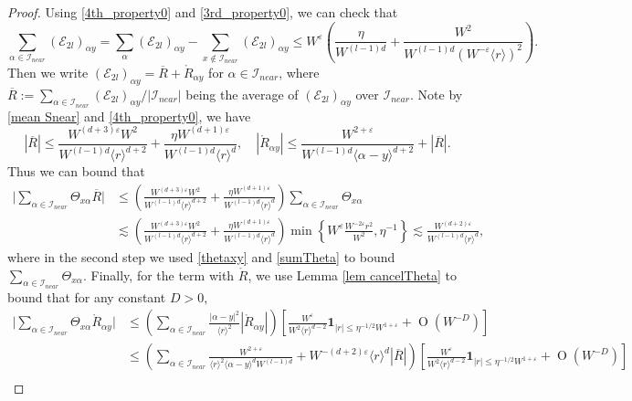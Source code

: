 \documentclass{article}
\newcommand{\1}{\mathds{1}}
\numberwithin{equation}{section}
\newcommand{\al}{\alpha}
\newcommand{\be}{\begin{equation}}
\newcommand{\ee}{\end{equation}}
\newcommand{\e}{{\varepsilon}}
\renewcommand{\cal}{\mathcal}
\newcommand{\wt}{\widetilde}
\renewcommand{\leq}{\leqslant}
\renewcommand{\le}{\leq}
\DeclareMathOperator{\OO}{O}
\theoremstyle{plain} %
\theoremstyle{remark}
\newcommand{\Selek}{{\mathcal E}}
\begin{document}
\begin{proof}
	Using \eqref{4th_property0} and \eqref{3rd_property0}, we can check that 
	\be\label{mean Snear}\sum_{\al\in \cal I_{near}} (\Selek_{2l})_{\al y}=\sum_\al (\Selek_{2l})_{\al y} - \sum_{x\notin \cal I_{near}} (\Selek_{2l})_{\al y} \le W^\e\left(\frac{\eta}{ W^{(l-1)d} } + \frac{W^2}{W^{(l-1)d} (W^{-\e}\langle r\rangle)^{2}}\right).\ee
	Then we write $ (\Selek_{2l})_{\al y} = \overline R + \mathring R_{\al y}$ for $\al \in \cal I_{near}$, where $\overline R:= \sum_{\al\in \cal I_{near}}(\Selek_{2l})_{\al y}/|\cal I_{near}|$ being the average of $(\Selek_{2l})_{\al y}$ over $\cal I_{near}$.   
	Note by \eqref{mean Snear} and \eqref{4th_property0}, we have  
	\be\label{bound barR} |\overline R| \le \frac{W^{(d+3)\e}W^2}{W^{(l-1)d}\langle r\rangle^{d+2}}+\frac{ \eta W^{(d+1)\e}}{W^{(l-1)d}\langle r\rangle^d},\quad \left| \mathring R_{\al y} \right| \le  \frac{W^{2+\e}}{W^{ (l-1)d}\langle \al-y\rangle^{d+2}} + |\overline R| .\ee
	Thus we can bound that 
	\begin{align*}
		\Big| \sum_{\al \in \cal I_{near}}\Theta_{  x \al} \overline R  \Big|&\le \left( \frac{W^{(d+3)\e}W^2}{W^{(l-1)d}\langle r\rangle^{d+2}}+\frac{ \eta W^{(d+1)\e}}{W^{(l-1)d}\langle r\rangle^d}\right)\sum_{\al\in \cal I_{near}}\Theta_{x\al} \\
		&\lesssim   \left( \frac{W^{(d+3)\e}W^2}{W^{(l-1)d}\langle r\rangle^{d+2}}+\frac{ \eta W^{(d+1)\e}}{W^{(l-1)d}\langle r\rangle^d}\right) \min\left\{W^\e\frac{W^{-2\e}r^2}{W^2},\eta^{-1}\right\} \lesssim  \frac{W^{(d+2)\e}}{W^{(l-1)d} \langle r\rangle^{d}},
	\end{align*}
	where in the second step we used \eqref{thetaxy} and \eqref{sumTheta} to bound $\sum_{\al\in \cal I_{near}}\Theta_{x\al} .$
	Finally, for the term with $\mathring R$, we use Lemma \ref{lem cancelTheta} to bound that for any constant $D>0$,
	\begin{align*}
		\Big| \sum_{\al\in \cal I_{near}}\Theta_{ x \al} \mathring R_{\al y} \Big|& \le  \left(\sum_{\al\in \cal I_{near}}\frac{|\al-y|^2}{\langle r\rangle^2}|\mathring R_{\al y}|\right) \left[  \frac{W^\e}{W^2\langle r\rangle^{d-2}}\mathbf 1_{|r|\le   \eta^{-1/2}W^{1+\e}}   + \OO(W^{-D})\right]\\
		& \le \left(\sum_{\al\in \cal I_{near}}\frac{W^{2+\e}}{\langle r\rangle^2\langle\al-y\rangle^d W^{(l-1)d}} + W^{-(d+2)\e} \langle r\rangle^d |\overline R|\right) \left[  \frac{W^\e}{W^2\langle r\rangle^{d-2}}\mathbf 1_{|r|\le   \eta^{-1/2}W^{1+\e}}   + \OO(W^{-D})\right]\\

\end{align*}
\end{proof}
\end{document}
